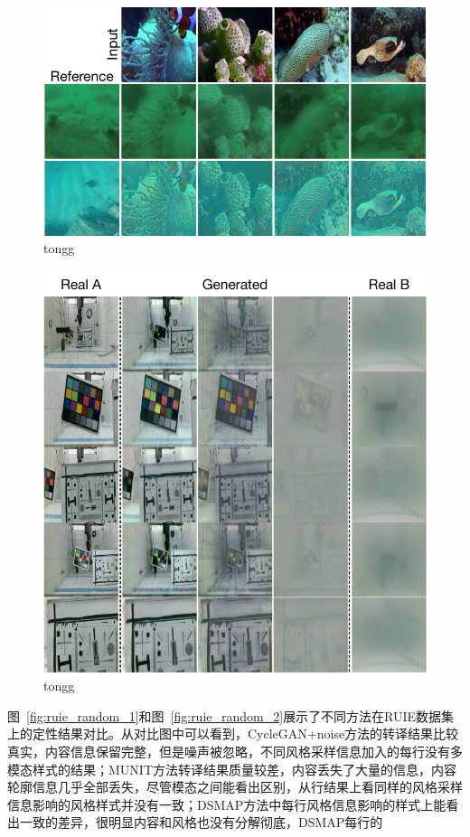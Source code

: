 \begin{figure}[ht]
    \centering
	\includegraphics[width=\textwidth]{figures/RUIE_guidance.pdf}
	\caption{tongg}
	\label{fig:ruie_guide}
\end{figure}

\begin{figure}[ht]
    \centering
	\includegraphics[width=\textwidth]{figures/UVB-change.pdf}
	\caption{tongg}
	\label{fig:uvb-change}
\end{figure}

图~\ref{fig:ruie_random_1}和图~\ref{fig:ruie_random_2}展示了不同方法在RUIE数据集上的定性结果对比。从对比图中可以看到，CycleGAN+noise方法的转译结果比较真实，内容信息保留完整，但是噪声被忽略，不同风格采样信息加入的每行没有多模态样式的结果；MUNIT方法转译结果质量较差，内容丢失了大量的信息，内容轮廓信息几乎全部丢失，尽管模态之间能看出区别，从行结果上看同样的风格采样信息影响的风格样式并没有一致；DSMAP方法中每行风格信息影响的样式上能看出一致的差异，很明显内容和风格也没有分解彻底，DSMAP每行的

